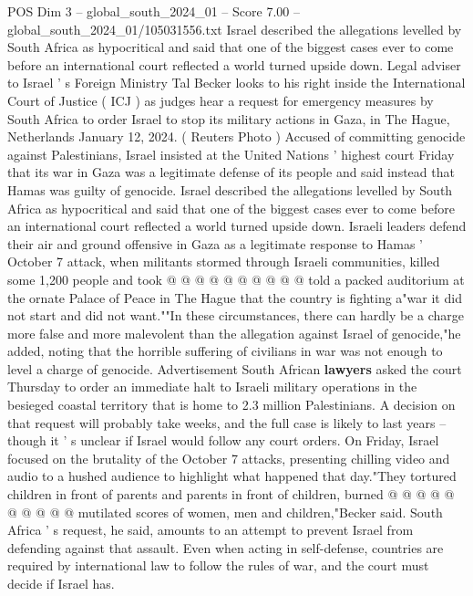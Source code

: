 \begin{textsample}{POS Dim 3 – global\_south\_2024\_01 – Score 7.00 – global\_south\_2024\_01/105031556.txt}  \label{ex:f3_pos_381}
Israel described the allegations levelled by South Africa as hypocritical and said that one of the biggest cases ever to come before an international court reflected a world turned upside down.
Legal adviser to Israel ' s Foreign Ministry Tal Becker looks to his right inside the International Court of Justice ( ICJ ) as judges hear a request for emergency measures by South Africa to order Israel to stop its military actions in Gaza, in The Hague, Netherlands January 12, 2024. ( Reuters Photo ) Accused of committing genocide against Palestinians, Israel insisted at the United Nations ' highest court Friday that its war in Gaza was a legitimate defense of its people and said instead that Hamas was guilty of genocide.
Israel described the allegations levelled by South Africa as hypocritical and said that one of the biggest cases ever to come before an international court reflected a world turned upside down.
Israeli leaders defend their air and ground offensive in Gaza as a legitimate response to Hamas ' October 7 attack, when militants stormed through Israeli communities, killed some 1,200 people and took @ @ @ @ @ @ @ @ @ @ told a packed auditorium at the ornate Palace of Peace in The Hague that the country is fighting a"war it did not start and did not want.""In these circumstances, there can hardly be a charge more false and more malevolent than the allegation against Israel of genocide,"he added, noting that the horrible suffering of civilians in war was not enough to level a charge of genocide.
Advertisement South African \textbf{lawyers} asked the court Thursday to order an immediate halt to Israeli military operations in the besieged coastal territory that is home to 2.3 million Palestinians.
A decision on that request will probably take weeks, and the full case is likely to last years -- though it ' s unclear if Israel would follow any court orders.
On Friday, Israel focused on the brutality of the October 7 attacks, presenting chilling video and audio to a hushed audience to highlight what happened that day."They tortured children in front of parents and parents in front of children, burned @ @ @ @ @ @ @ @ @ @ mutilated scores of women, men and children,"Becker said.
South Africa ' s request, he said, amounts to an attempt to prevent Israel from defending against that assault.
Even when acting in self-defense, countries are required by international law to follow the rules of war, and the court must decide if Israel has.

\end{textsample}
